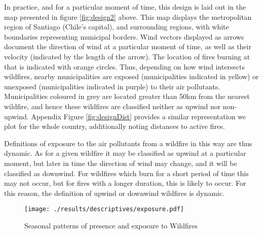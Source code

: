 \documentclass[11pt]{article}
\begin{document}
\begin{spacing}{1.5}
In practice, and for a particular moment of time, this design is laid out in the map presented in figure \ref{fig:design2} above.  This map displays the metropolitan region of Santiago (Chile's capital), and surrounding regions, with white boundaries representing municipal borders.  Wind vectors displayed as arrows document the direction of wind at a particular moment of time, as well as their velocity (indicated by the length of the arrow).  The location of fires burning at that is indicated with orange circles. Thus, depending on how wind intersects wildfires, nearby municipalities are exposed (municipalities indicated in yellow) or unexposed (municipalities indicated in purple) to their air pollutants. Municipalities coloured in grey are located greater than 50km from the nearest wildfire, and hence these wildfires are classified neither as upwind nor non-upwind. Appendix Figure \ref{fig:designDist} provides a similar representation we plot for the whole country, additionally noting distances to active fires.

Definitions of exposure to the air pollutants from a wildfire in this way are thus dynamic. As for a given wildfire it may be classified as upwind at a particular moment, but later in time the direction of wind may change, and it will be classified as downwind.  For wildfires which burn for a short period of time this may not occur, but for fires with a longer duration, this is likely to occur. For this reason, the definition of upwind or downwind wildfires is dynamic. 

\begin{figure}
    \centering
    \texttt{[image: ./results/descriptives/exposure.pdf]}
    \caption{Seasonal patterns of presence and exposure to Wildfires}
    \label{fig:time}
\end{figure}    


\end{spacing}
\end{document}

